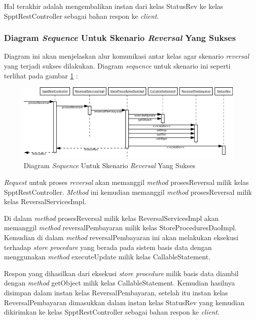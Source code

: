 \documentclass[pdftex,12pt, oneside]{article}
\begin{document}
Hal terakhir adalah mengembalikan instan dari kelas StatusRev ke kelas SpptRestController sebagai bahan respon ke \textit{client}.

\subsubsection{Diagram \textit{Sequence} Untuk Skenario \textit{Reversal} Yang Sukses}

Diagram ini akan menjelaskan alur komunikasi antar kelas agar skenario \textit{reversal} yang terjadi sukses dilakukan. Diagram \textit{sequence} untuk skenario ini seperti terlihat pada gambar \ref{fig:uml-seq-rev} :

\begin{figure}[H]
  \centering
  \includegraphics[width=1\textwidth]{./resources/uml/uml-seq-rev}
  \caption{Diagram \textit{Sequence} Untuk Skenario \textit{Reversal} Yang Sukses}
  \label{fig:uml-seq-rev}
\end{figure}

\textit{Request} untuk proses \textit{reversal} akan memanggil \textit{method} prosesReversal milik kelas SpptRestController. \textit{Method} ini kemudian memanggil \textit{method} prosesReversal milik kelas ReversalServicesImpl.

Di dalam \textit{method} prosesReversal milik kelas ReversalServicesImpl akan memanggil \textit{method} reversalPembayaran milik kelas StoreProceduresDaoImpl. Kemudian di dalam \textit{method} reversalPembayaran ini akan melakukan eksekusi terhadap \textit{store procedure} yang berada pada sistem basis data dengan menggunakan \textit{method} executeUpdate milik kelas CallableStatement.

Respon yang dihasilkan dari eksekusi \textit{store procedure} milik basis data diambil dengan \textit{method} getObject milik kelas CallableStatement. Kemudian hasilnya disimpan dalam instan kelas ReversalPembayaran, setelah itu instan kelas ReversalPembayaran dimasukkan dalam instan kelas StatusRev yang kemudian dikirimkan ke kelas SpptRestController sebagai bahan respon ke \textit{client}.
\end{document}
